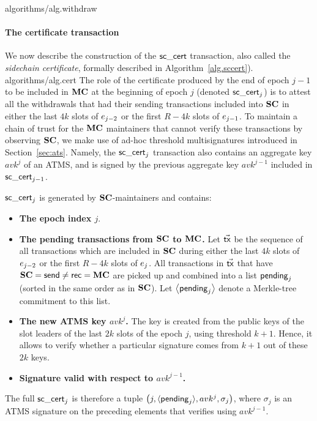 {algorithms/alg.withdraw}

\paragraph{The certificate transaction}
\label{sec:sccert}

We now describe the construction of the $\mathsf{sc\_cert}$ transaction, also called the
\emph{sidechain certificate}, formally described in
Algorithm~\ref{alg.sccert}).
{algorithms/alg.cert}
The role of the
certificate produced by the end of epoch $j-1$ to be included in $\mathbf{MC}$ at
the beginning of epoch ${j}$ (denoted $\mathsf{sc\_cert}_{j}$)  is to attest
all the withdrawals that had their sending transactions included
into $\mathbf{SC}$
in either the last $4k$ slots of $e_{j-2}$ or the first $R-4k$ slots
of $e_{j-1}$.
To maintain a chain of trust for the $\mathbf{MC}$ maintainers that cannot
verify these transactions by observing $\mathbf{SC}$, we make use of
ad-hoc threshold multisignatures introduced in Section~\ref{sec:ats}.
Namely, the $\mathsf{sc\_cert}_{j}$ transaction
also contains an aggregate key $avk^{j}$ of an ATMS, and is signed by the
previous aggregate key $avk^{j-1}$ included in $\mathsf{sc\_cert}_{j-1}$.

$\mathsf{sc\_cert}_{j}$ is generated by $\mathbf{SC}$-maintainers
and contains:
\begin{itemize}
    \item
          \textbf{The epoch index $j$}.
    \item
          \textbf{The pending transactions from $\mathbf{SC}$ to $\mathbf{MC}$.}
          Let $\vec{\mathsf{tx}}$ be the sequence of all transactions
          which are included in $\mathbf{SC}$ during either
          the last $4k$ slots of $e_{j-2}$ or the first $R-4k$ slots of
          $e_j$. All transactions in $\vec{\mathsf{tx}}$ that have $\mathbf{SC}=\mathsf{send} \neq \mathsf{rec}=\mathbf{MC}$
          are picked up and combined into a list $\mathsf{pending}_{j}$ (sorted in the
          same order as in $\mathbf{SC}$). Let $\left\langle \mathsf{pending}_{j} \right\rangle$ denote a Merkle-tree commitment to
          this list.

    \item
          \textbf{The new ATMS key $avk^{j}$.}
          The key is created from the public keys of the slot
          leaders of the last $2k$ slots of the epoch $j$, using
          threshold $k+1$. Hence, it allows to verify whether a particular signature comes
          from $k+1$ out of these $2k$ keys.
    \item
          \textbf{Signature valid with respect to $avk^{j-1}$.}
\end{itemize}
The full $\mathsf{sc\_cert}_{j}$ is therefore a tuple
$\left(j,\langle\mathsf{pending}_{j}\rangle,avk^{j},\sigma_{j}\right)$,
where $\sigma_{j}$ is an ATMS signature on the preceding elements that verifies
using $avk^{j-1}$.

